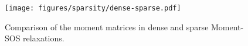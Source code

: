 
\begin{figure}[htbp]
    \centering
        \texttt{[image: figures/sparsity/dense-sparse.pdf]}
    \caption{Comparison of the moment matrices in dense and sparse Moment-SOS relaxations.
    \label{fig:sp:compare-dense-sparse}}
    \vspace{-6mm}
\end{figure}